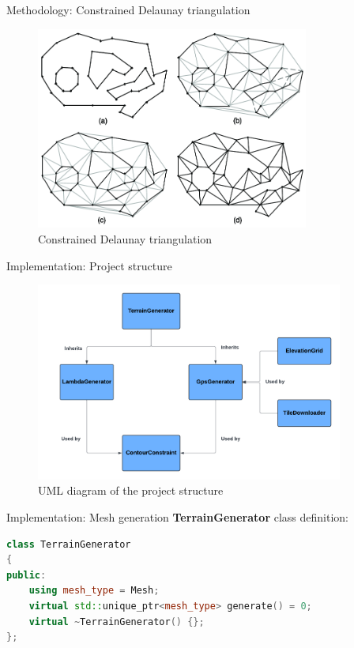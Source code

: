 \documentclass[10pt]{beamer}
\begin{document}
\begin{frame}{Methodology: Constrained Delaunay triangulation}
  \Large
  \begin{figure}[H]
    \centering
    \includegraphics[width=0.8\textwidth]{images/constrained-delaunay-triangulation.png}
    \caption{Constrained Delaunay triangulation \cite{img:cdt}}
\end{figure}
\end{frame}

\begin{frame}{Implementation: Project structure}
  \begin{figure}[H]
    \centering
    \includegraphics[width=0.9\textwidth]{images/uml-structure.png}
    \caption{UML diagram of the project structure}
  \end{figure}
\end{frame}

\begin{frame}[fragile]{Implementation: Mesh generation}
  \Large
  \textbf{TerrainGenerator} class definition:
  \vspace{2em}
  \begin{lstlisting}[language=C++]
class TerrainGenerator
{
public:
    using mesh_type = Mesh;
    virtual std::unique_ptr<mesh_type> generate() = 0;
    virtual ~TerrainGenerator() {};
};
  \end{lstlisting}
\end{frame}
\end{document}
